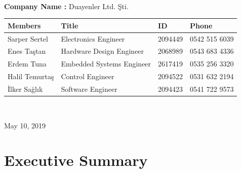 \documentclass[a4paper,12pt]{article}
\begin{document}
\begin{titlepage}
\begin{minipage}[r]{0.35\textwidth}
		\end{minipage}\\[1cm]
		\begin{minipage}{\textwidth}
			\begin{flushleft}
				\large{\textbf{Company Name :}}	Duayenler Ltd. Şti.\\
				\begin{table}[H]
					\begin{tabular}{l l l l}
						\hline
						\textbf{Members} & \textbf{Title}            & \textbf{ID} & \textbf{Phone} \\ \hline
						Sarper Sertel    & Electronics Engineer      & 2094449     & 0542 515 6039  \\ 
						Enes Taştan     & Hardware Design Engineer  & 2068989     & 0543 683 4336  \\ 
						Erdem Tuna       & Embedded Systems Engineer & 2617419     & 0535 256 3320  \\ 
						Halil Temurtaş  & Control Engineer          & 2094522     & 0531 632 2194  \\
						İlker Sağlık  & Software Engineer         & 2094423     & 0541 722 9573  \\ \hline
						
						
					\end{tabular}
				\end{table}
			\end{flushleft}
		\end{minipage}\\[1cm]
		
		\begin{flushbottom}
			{\large May 10, 2019} %
		\end{flushbottom}
		
	\end{titlepage}
	
	\tableofcontents
	\newpage

	\section{Executive Summary}
\end{document}
